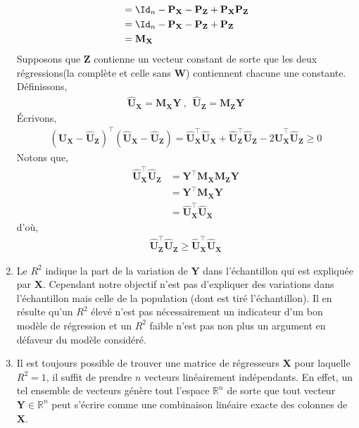 \begin{enumerate}
\begin{align*}
&=\Id_n - \mathbf{P}_\mathbf{X} - \mathbf{P}_\mathbf{Z} + \mathbf{P}_\mathbf{X}\mathbf{P}_\mathbf{Z}\\
&=\Id_n - \mathbf{P}_\mathbf{X} - \mathbf{P}_\mathbf{Z} +  \mathbf{P}_\mathbf{Z}\\
& = \mathbf{M}_\mathbf{X}
\end{align*}
Supposons que $\mathbf{Z}$ contienne un vecteur constant de sorte que les deux régressions(la complète et celle sans $\mathbf{W}$) contiennent chacune une constante. Définissons,
\begin{align*}
\widehat{\mathbf{U}}_\mathbf{X} = \mathbf{M}_\mathbf{X}\mathbf{Y} \ , \ \  
\widehat{\mathbf{U}}_\mathbf{Z} = \mathbf{M}_\mathbf{Z}\mathbf{Y}
\end{align*}
\'Ecrivons,
\begin{align*}
(\widehat{\mathbf{U}}_\mathbf{X} - \widehat{\mathbf{U}}_\mathbf{Z})^\top(\widehat{\mathbf{U}}_\mathbf{X} - \widehat{\mathbf{U}}_\mathbf{Z}) = \widehat{\mathbf{U}}_\mathbf{X}^\top \widehat{\mathbf{U}}_\mathbf{X} + \widehat{\mathbf{U}}_\mathbf{Z}^\top\widehat{\mathbf{U}}_\mathbf{Z} -2\widehat{\mathbf{U}}_\mathbf{X} ^\top\widehat{\mathbf{U}}_\mathbf{Z}\geq 0
\end{align*}
Notons que,
\begin{align*}
\widehat{\mathbf{U}}_\mathbf{X} ^\top\widehat{\mathbf{U}}_\mathbf{Z}  &= \mathbf{Y}^\top\mathbf{M}_\mathbf{X}\mathbf{M}_\mathbf{Z}\mathbf{Y}\\
& = 
\mathbf{Y}^\top\mathbf{M}_\mathbf{X}\mathbf{Y}\\
& = \widehat{\mathbf{U}}_\mathbf{X}^\top\widehat{\mathbf{U}}_\mathbf{X}
\end{align*}
d'où,
\begin{align*}
\widehat{\mathbf{U}}_\mathbf{Z}^\top\widehat{\mathbf{U}}_\mathbf{Z}\geq \widehat{\mathbf{U}}_\mathbf{X}^\top\widehat{\mathbf{U}}_\mathbf{X}
\end{align*}
\item Le $R^2$ indique la part de la variation de $\mathbf{Y}$ dans l'échantillon qui est expliquée par $\mathbf{X}$. Cependant notre objectif n'est pas d'expliquer des variations dans l'échantillon mais celle de la population (dont est tiré l'échantillon). Il en résulte qu'un $R^2$ élevé n'est pas nécessairement un indicateur d'un bon modèle de régression et un $R^2$ faible n'est pas non plus un argument en défaveur du modèle considéré.
\item Il est toujours possible de trouver une matrice de régresseurs $\mathbf{X}$ pour laquelle $R^2 = 1$, il suffit de prendre $n$ vecteurs linéairement indépendants. En effet, un tel ensemble de vecteurs génère tout l'espace $\mathbb{R}^n$ de sorte que tout vecteur $\mathbf{Y}\in\mathbb{R}^n$ peut s'écrire comme une combinaison linéaire exacte des colonnes de $\mathbf{X}$.
\end{enumerate}

